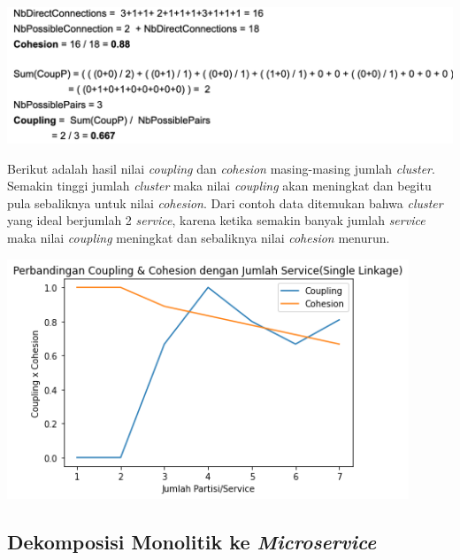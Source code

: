 \begin{center}
	\includegraphics[width=14cm]{img/bab_3/eval_detail2.png}
	\label{fig:asd}
\end{center}

Berikut adalah hasil nilai \textit{coupling} dan \textit{cohesion} masing-masing jumlah \textit{cluster}. Semakin tinggi jumlah \textit{cluster} maka nilai \textit{coupling} akan meningkat dan begitu pula sebaliknya untuk nilai \textit{cohesion}. Dari contoh data ditemukan bahwa \textit{cluster} yang ideal berjumlah 2 \textit{service}, karena ketika semakin banyak jumlah \textit{service} maka nilai \textit{coupling} meningkat dan sebaliknya nilai \textit{cohesion} menurun.


\begin{center}
	\includegraphics[width=12cm]{img/bab_3/cohVScoup_single.png}
	\label{fig:asd}
\end{center}

\pagebreak

\subsection{Dekomposisi Monolitik ke \textit{Microservice}}
